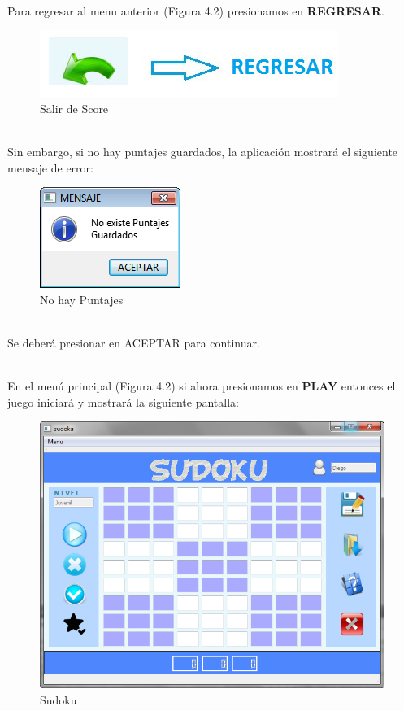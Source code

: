 \ \\ Para regresar al menu anterior (Figura 4.2) presionamos en \textbf{REGRESAR}.

\begin{figure}[htbp]
\begin{center}
\includegraphics[width=.40\textwidth]{./imagenes/Regresar.png}
\caption{Salir de Score}
\label{Salir de Score}
\end{center}
\end{figure} 

\ \\Sin embargo, si no hay puntajes guardados, la aplicación mostrará el siguiente mensaje de error:

\begin{figure}[htbp]
\begin{center}
\includegraphics[width=.20\textwidth]{./imagenes/Puntajes2.png}
\caption{No hay Puntajes}
\label{No hay Puntajes}
\end{center}
\end{figure} 

\ \\Se deberá presionar en ACEPTAR para continuar.


\ \\ En el menú principal (Figura 4.2) si ahora presionamos en  \textbf{PLAY} entonces el juego iniciará y mostrará la siguiente pantalla:

\begin{figure}[htbp]
\begin{center}
\includegraphics[width=.35\textwidth]{./imagenes/Sudoku.png}
\caption{Sudoku}
\label{Sudoku}
\end{center}
\end{figure} 

